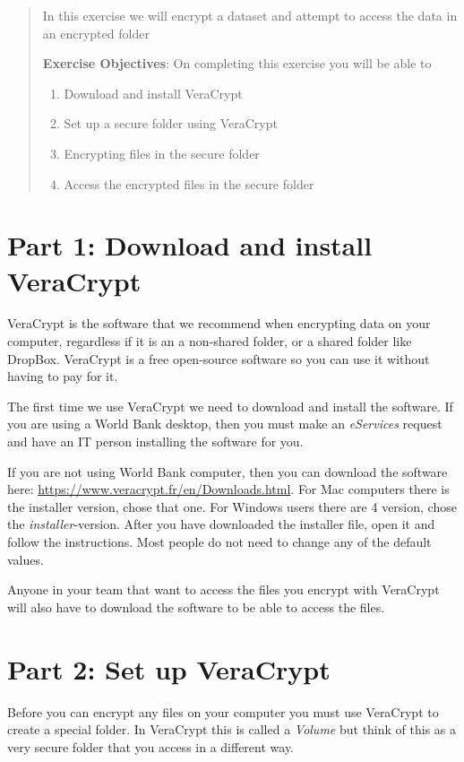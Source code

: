 \documentclass{tufte-handout}
\begin{document}
\begin{abstract}
In this exercise we will encrypt a dataset and attempt to access the data in an encrypted folder

\bigskip\noindent \textbf{Exercise Objectives}: On completing this exercise you will be able to
\begin{enumerate}
  \item Download and install VeraCrypt
  \item Set up a secure folder using VeraCrypt
  \item Encrypting files in the secure folder
  \item Access the encrypted files in the secure folder
\end{enumerate}
\end{abstract}

\section{Part 1: Download and install VeraCrypt}

VeraCrypt is the software that we recommend when encrypting data on your computer, regardless if it is an a non-shared folder, or a shared folder like DropBox. VeraCrypt is a free open-source software so you can use it without having to pay for it.

The first time we use VeraCrypt we need to download and install the software. If you are using a World Bank desktop, then you must make an \textit{eServices} request and have an IT person installing the software for you.

If you are not using World Bank computer, then you can download the software here: \url{https://www.veracrypt.fr/en/Downloads.html}. For Mac computers there is the installer version, chose that one. For Windows users there are 4 version, chose the \textit{installer}-version. After you have downloaded the installer file, open it and follow the instructions. Most people do not need to change any of the default values.

Anyone in your team that want to access the files you encrypt with VeraCrypt will also have to download the software to be able to access the files.

\section{Part 2: Set up VeraCrypt}

Before you can encrypt any files on your computer you must use VeraCrypt to create a special folder. In VeraCrypt this is called a \textit{Volume} but think of this as a very secure folder that you access in a different way.
\end{document}
